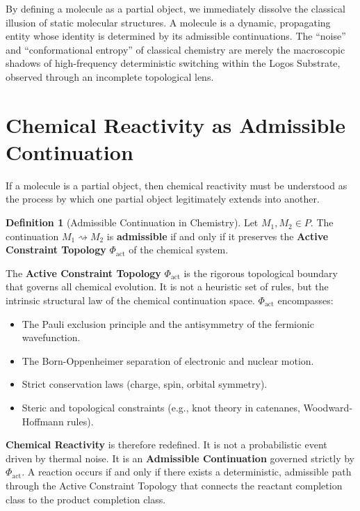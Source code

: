 \documentclass[11pt,openany]{extbook}
\theoremstyle{plain}
\theoremstyle{definition}
\newtheorem{definition}{Definition}[chapter]
\begin{document}
By defining a molecule as a partial object, we immediately dissolve the classical illusion of static molecular structures. A molecule is a dynamic, propagating entity whose identity is determined by its admissible continuations. The ``noise'' and ``conformational entropy'' of classical chemistry are merely the macroscopic shadows of high-frequency deterministic switching within the Logos Substrate, observed through an incomplete topological lens.

\section{Chemical Reactivity as Admissible Continuation}

If a molecule is a partial object, then chemical reactivity must be understood as the process by which one partial object legitimately extends into another.

\begin{definition}[Admissible Continuation in Chemistry]
Let $M_1, M_2 \in P$. The continuation $M_1 \rightsquigarrow M_2$ is \textbf{admissible} if and only if it preserves the \textbf{Active Constraint Topology} $\Phi_{\text{act}}$ of the chemical system.
\end{definition}

The \textbf{Active Constraint Topology} $\Phi_{\text{act}}$ is the rigorous topological boundary that governs all chemical evolution. It is not a heuristic set of rules, but the intrinsic structural law of the chemical continuation space. $\Phi_{\text{act}}$ encompasses:
\begin{itemize}
\item The Pauli exclusion principle and the antisymmetry of the fermionic wavefunction.
\item The Born-Oppenheimer separation of electronic and nuclear motion.
\item Strict conservation laws (charge, spin, orbital symmetry).
\item Steric and topological constraints (e.g., knot theory in catenanes, Woodward-Hoffmann rules).
\end{itemize}

\textbf{Chemical Reactivity} is therefore redefined. It is not a probabilistic event driven by thermal noise. It is an \textbf{Admissible Continuation} governed strictly by $\Phi_{\text{act}}$. A reaction occurs if and only if there exists a deterministic, admissible path through the Active Constraint Topology that connects the reactant completion class to the product completion class.
\end{document}
